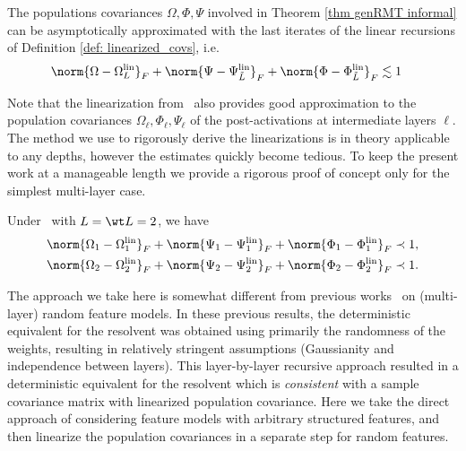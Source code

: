 \begin{conjecture}
    The populations covariances $\Omega, \Phi,\Psi$ involved in Theorem \ref{thm genRMT informal} can be asymptotically approximated with the last iterates of the linear recursions of Definition \ref{def: linearized_covs}, i.e.
    \begin{align}
        \norm{\Omega-\Omega_L^\mathrm{lin}}_F + \norm{\Psi-\Psi_{\tilde{L}}^\mathrm{lin}}_F + \norm{\Phi-\Phi_{\tilde{L}}^\mathrm{lin}}_F &\lesssim 1
    \end{align}
\end{conjecture}

Note that the linearization from~ also provides good approximation to the population covariances $\Omega_\ell,\Phi_\ell,\Psi_\ell$ of the post-activations at intermediate layers $\ell$. The method we use to rigorously derive the linearizations is in theory applicable to any depths, however the estimates quickly become tedious. To keep the present work at a manageable length we provide a rigorous proof of concept only for the simplest multi-layer case.
\begin{theorem}\label{theo lin}
    Under~ with $L=\wt L = 2$, we have 
    \begin{equation*}
        \begin{split}
        \norm{\Omega_1-\Omega_1^\mathrm{lin}}_F + \norm{\Psi_1-\Psi_1^\mathrm{lin}}_F + \norm{\Phi_1-\Phi_1^\mathrm{lin}}_F &\prec 1,\\
        \norm{\Omega_2 - \Omega_2^{\mathrm{lin}}}_F + 
        \norm{\Psi_2-\Psi_2^\mathrm{lin}}_F + \norm{\Phi_2-\Phi_2^\mathrm{lin}}_F&\prec 1.
        \end{split}
    \end{equation*} 
\end{theorem}
\begin{remark}[Comparison]
    The approach we take here is somewhat different from previous works~\cite{schroder2023deterministic,Fan2020SpectraOT,2306.05850} on (multi-layer) random feature models. In these previous results, the deterministic equivalent for the resolvent was obtained using primarily the randomness of the weights, resulting in relatively stringent assumptions (Gaussianity and independence between layers). This layer-by-layer recursive approach resulted in a deterministic equivalent for the resolvent which is \emph{consistent} with a sample covariance matrix with linearized population covariance. Here we take the direct approach of considering feature models with arbitrary structured features, and then linearize the population covariances in a separate step for random features.  
\end{remark}

